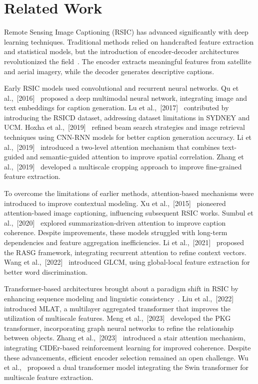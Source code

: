 \section{Related Work}
\label{sec_relwork}
Remote Sensing Image Captioning (RSIC) has advanced significantly with deep learning techniques. Traditional methods relied on handcrafted feature extraction and statistical models, but the introduction of encoder-decoder architectures revolutionized the field~\cite{qu2016deep,hoxha2021novel,li2019vision}. The encoder extracts meaningful features from satellite and aerial imagery, while the decoder generates descriptive captions. 

Early RSIC models used convolutional and recurrent neural networks. Qu et al.,~[2016]~\cite{qu2016deep} proposed a deep multimodal neural network, integrating image and text embeddings for caption generation. Lu et al.,~[2017]~\cite{lu2017exploring} contributed by introducing the RSICD dataset, addressing dataset limitations in SYDNEY and UCM. Hoxha et al.,~[2019]~\cite{hoxha2020new,hoxha2020toward} refined beam search strategies and image retrieval techniques using CNN-RNN models for better caption generation accuracy. Li et al.,~[2019]~\cite{li2019vision} introduced a two-level attention mechanism that combines text-guided and semantic-guided attention to improve spatial correlation. Zhang et al.,~[2019]~\cite{zhang2019multi} developed a multiscale cropping approach to improve fine-grained feature extraction.

To overcome the limitations of earlier methods, attention-based mechanisms were introduced to improve contextual modeling. Xu et al.,~[2015]~\cite{xu2015show} pioneered attention-based image captioning, influencing subsequent RSIC works. Sumbul et al.,~[2020]~\cite{sumbul2020sd} explored summarization-driven attention to improve caption coherence. Despite improvements, these models struggled with long-term dependencies and feature aggregation inefficiencies. Li et al.,~[2021]~\cite{li2021recurrent} proposed the RASG framework, integrating recurrent attention to refine context vectors. Wang et al.,~[2022]~\cite{wang2022glcm} introduced GLCM, using global-local feature extraction for better word discrimination.

Transformer-based architectures brought about a paradigm shift in RSIC by enhancing sequence modeling and linguistic consistency~\cite{vaswani2017attention}. Liu et al.,~[2022]~\cite{liu2022remote} introduced MLAT, a multilayer aggregated transformer that improves the utilization of multiscale features. Meng et al.,~[2023]~\cite{meng2023prior} developed the PKG transformer, incorporating graph neural networks to refine the relationship between objects. Zhang et al.,~[2023]~\cite{zhang2023multi} introduced a stair attention mechanism, integrating CIDEr-based reinforcement learning for improved coherence. Despite these advancements, efficient encoder selection remained an open challenge. Wu et al.,~\cite{wu2024trtr} proposed a dual transformer model integrating the Swin transformer for multiscale feature extraction.

